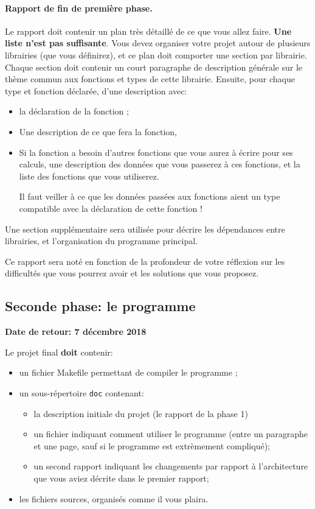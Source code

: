 \documentclass[a4paper]{article}
\begin{document}
\paragraph{Rapport de fin de première phase.}
Le rapport doit contenir un plan très détaillé de ce que vous allez
faire. \textbf{Une liste n'est pas suffisante}. Vous devez organiser
votre projet autour de plusieurs librairies (que vous définirez), et
ce plan doit comporter une section par librairie. Chaque section doit
contenir un court paragraphe de description g{\'e}n{\'e}rale sur le
thème commun aux fonctions et types de cette librairie. Ensuite, pour
chaque type et fonction d{\'e}clar{\'e}e, d'une description avec:
\begin{itemize}
\item la déclaration de la fonction ;
\item Une description de ce que fera la fonction, 
\item Si la fonction a besoin d'autres fonctions que vous aurez à
  écrire pour ses calculs, une description des données que vous
  passerez à ces fonctions, et la liste des fonctions que vous utiliserez.
  \begin{center}
    Il faut veiller à ce que les données passées aux fonctions aient
    un type compatible avec la déclaration de cette fonction !
  \end{center}
\end{itemize}

Une section suppl{\'e}mentaire sera utilis{\'e}e pour d{\'e}crire les d{\'e}pendances
entre librairies, et l'organisation du programme principal.

Ce rapport sera noté en fonction de la profondeur de votre réflexion sur les
difficultés que vous pourrez avoir et les solutions que vous proposez. 

\subsection{Seconde phase: le programme}

\begin{center}
   \bf Date de retour:  7 décembre 2018
\end{center}

Le projet final \textbf{doit} contenir:
\begin{itemize}
\item un fichier Makefile permettant de compiler le programme ;
\item un sous-r{\'e}pertoire \texttt{doc} contenant:
  \begin{itemize}
  \item la description initiale du projet (le rapport de la phase 1)
  \item un fichier indiquant comment utiliser le programme (entre un
    paragraphe et une page, sauf si le programme est extrèmement compliqué);
  \item un second rapport indiquant les changements par rapport
    {\`a} l'architecture que vous aviez décrite dans le premier rapport;
  \end{itemize}
\item les fichiers sources, organis{\'e}s comme il vous plaira.
\end{itemize}
\end{document}

